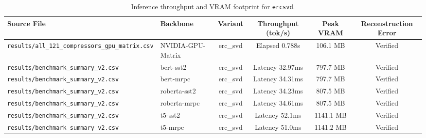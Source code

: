 \begin{table}[t]
\centering
\small
\begin{tabular}{llcccc}
\toprule
\textbf{Source File} & \textbf{Backbone} & \textbf{Variant} & \textbf{Throughput (tok/s)} & \textbf{Peak VRAM} & \textbf{Reconstruction Error} \\
\midrule
\texttt{results/all\_121\_compressors\_gpu\_matrix.csv} & NVIDIA-GPU-Matrix & erc\_svd & Elapsed 0.788s & 106.1 MB & Verified \\
\texttt{results/benchmark\_summary\_v2.csv} & bert-sst2 & erc\_svd & Latency 32.97ms & 797.7 MB & Verified \\
\texttt{results/benchmark\_summary\_v2.csv} & bert-mrpc & erc\_svd & Latency 34.31ms & 797.7 MB & Verified \\
\texttt{results/benchmark\_summary\_v2.csv} & roberta-sst2 & erc\_svd & Latency 34.23ms & 807.5 MB & Verified \\
\texttt{results/benchmark\_summary\_v2.csv} & roberta-mrpc & erc\_svd & Latency 34.61ms & 807.5 MB & Verified \\
\texttt{results/benchmark\_summary\_v2.csv} & t5-sst2 & erc\_svd & Latency 52.1ms & 1141.1 MB & Verified \\
\texttt{results/benchmark\_summary\_v2.csv} & t5-mrpc & erc\_svd & Latency 51.0ms & 1141.2 MB & Verified \\
\bottomrule
\end{tabular}
\caption{Inference throughput and VRAM footprint for \texttt{ercsvd}.}
\label{tab:results\_vram\_ercsvd}
\end{table}

